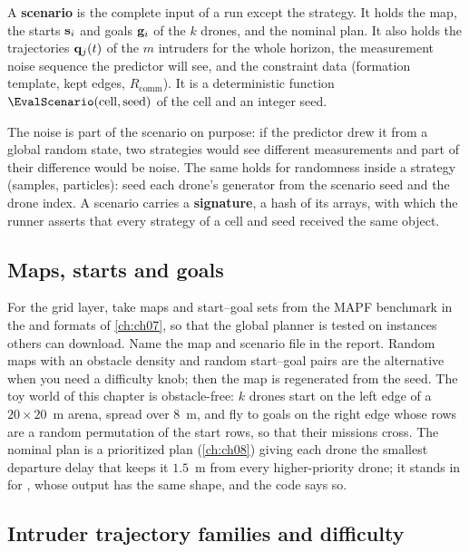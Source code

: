 \begin{definition}[Scenario]
\label{def:ch25-scenario}
A \textbf{scenario} is the complete input of a run except
the strategy. It holds the map, the starts $\mathbf{s}_i$ and goals
$\mathbf{g}_i$ of the $k$ drones, and the nominal plan. It also holds the
trajectories $\mathbf{q}_j(t)$ of the $m$ intruders for the whole horizon, the
measurement noise sequence the predictor will see, and the constraint data
(formation template, kept edges, $R_{\mathrm{comm}}$). It is a deterministic function
$\EvalScenario(\text{cell}, \text{seed})$ of the cell and an integer seed.
\end{definition}

The noise is part of the scenario on purpose: if the predictor drew it from
a global random state, two strategies would see different measurements and
part of their difference would be noise. The same holds for randomness
inside a strategy (\rrt samples, particles): seed each drone's generator
from the scenario seed and the drone index. A scenario carries a
\textbf{signature}, a hash of its arrays, with
which the runner asserts that every strategy of a cell and seed received
the same object.

\subsection{Maps, starts and goals}

For the grid layer, take maps and start--goal sets from the MAPF benchmark
in the  and  formats of \cref{ch:ch07}, so that the
global planner is tested on instances others can download. Name the map
and scenario file in the report. Random maps with an obstacle density and
random start--goal pairs are the alternative when you need a difficulty
knob; then the map is regenerated from the seed. The toy world of this
chapter is obstacle-free: $k$ drones start on the left edge of a $20 \times
20$~m arena, spread over $8$~m, and fly to goals on the right edge whose rows
are a random permutation of the start rows, so that their missions cross.
The nominal plan is a prioritized plan (\cref{ch:ch08}) giving each drone
the smallest departure delay that keeps it $1.5$~m from every
higher-priority drone; it stands in for \cbs, whose output has the same
shape, and the code says so.

\subsection{Intruder trajectory families and difficulty}

